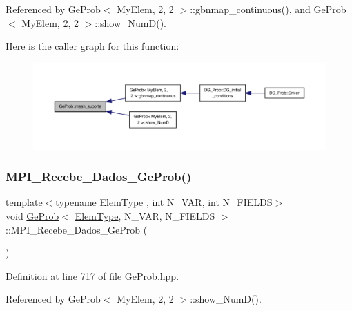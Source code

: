 Referenced by Ge\+Prob$<$ My\+Elem, 2, 2 $>$\+::gbnmap\+\_\+continuous(), and Ge\+Prob$<$ My\+Elem, 2, 2 $>$\+::show\+\_\+\+Num\+D().

Here is the caller graph for this function\+:
\nopagebreak
\begin{figure}[H]
\begin{center}
\leavevmode
\includegraphics[width=350pt]{classGeProb_ab33e0027b5ae2b712b91690b8cb75e90_icgraph}
\end{center}
\end{figure}
\mbox{\label{classGeProb_a79ef11abf1d43923fb5a3613a3fa654e}} 
\subsubsection{\texorpdfstring{M\+P\+I\+\_\+\+Recebe\+\_\+\+Dados\+\_\+\+Ge\+Prob()}{MPI\_Recebe\_Dados\_GeProb()}}
{\footnotesize\ttfamily template$<$typename Elem\+Type , int N\+\_\+\+V\+AR, int N\+\_\+\+F\+I\+E\+L\+DS$>$ \\
void \hyperlink{classGeProb}{Ge\+Prob}$<$ \hyperlink{spectral_8h_aaa2c1a7b2d1b12c590d730fe6ac839fa}{Elem\+Type}, N\+\_\+\+V\+AR, N\+\_\+\+F\+I\+E\+L\+DS $>$\+::M\+P\+I\+\_\+\+Recebe\+\_\+\+Dados\+\_\+\+Ge\+Prob (\begin{DoxyParamCaption}{ }\end{DoxyParamCaption})}



Definition at line 717 of file Ge\+Prob.\+hpp.



Referenced by Ge\+Prob$<$ My\+Elem, 2, 2 $>$\+::show\+\_\+\+Num\+D().

